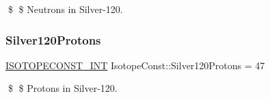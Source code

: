 \$ \$ Neutrons in Silver-\/120. \mbox{\label{group___isotope_const-_silver-_ag120_ga1f7d911527c9b097f6cc288dd23c3936}} 
\subsubsection{\texorpdfstring{Silver120\+Protons}{Silver120Protons}}
{\footnotesize\ttfamily \mbox{\hyperlink{group___isotope_const-_macros_ga5f18360b3e99483a35c32d789e62621c}{I\+S\+O\+T\+O\+P\+E\+C\+O\+N\+S\+T\+\_\+\+I\+NT}} Isotope\+Const\+::\+Silver120\+Protons = 47}

\$ \$ Protons in Silver-\/120. 